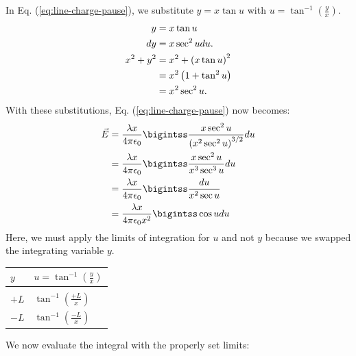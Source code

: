 \documentclass[12pt,b4paper]{article}
\begin{document}
In Eq. (\ref{eq:line-charge-pause}), we substitute $y=x\tan{u}$ with $\displaystyle u=\tan^{-1}\left(\frac{y}{x}\right)$.
\begin{align*}
    y&=x\tan{u}\\
    dy&=x\sec^2{u}du.\\
    x^2+y^2&=x^2+\left(x\tan{u}\right)^2\\
    &=x^2\left(1+\tan^2{u}\right)\notag\\
    &=x^2\sec^2{u}.
\end{align*}
With these substitutions, Eq. (\ref{eq:line-charge-pause}) now becomes:
\begin{align}
    \vec{E}&=\frac{\lambda x}{4\pi\epsilon_0}\bigintss\frac{x\sec^2{u}}{\left(x^2\sec^2{u}\right)^{3/2}}du\notag\\
    &=\frac{\lambda x}{4\pi\epsilon_0}\bigintss\frac{x\sec^2{u}}{x^3\sec^3{u}}du\notag\\
    &=\frac{\lambda x}{4\pi\epsilon_0}\bigintss\frac{du}{x^2\sec{u}}\notag\\
    &=\frac{\lambda x}{4\pi\epsilon_0x^2}\bigintss\cos{u}{du}\notag
\end{align}
Here, we must apply the limits of integration for $u$ and not $y$ because we swapped the integrating variable $y$.
\begin{table}[H]
    \centering
    \begin{tabular}{P{1.0cm}|P{3.0cm}}
    $y$ & $\displaystyle u=\tan^{-1}\left(\frac{y}{x}\right)$ \\[8pt]\hline\hline\\
    $+L$ & $\displaystyle\tan^{-1}\left(\frac{+L}{x}\right)$\\[12pt]
    $-L$ & $\displaystyle\tan^{-1}\left(\frac{-L}{x}\right)$\\
\end{tabular}
\end{table}
We now evaluate the integral with the properly set limits:
\end{document}
